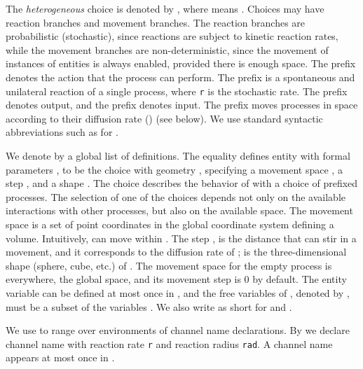 \documentclass[submission,
copyright,
creativecommons
]{eptcs}
\begin{document}
The \textit{heterogeneous} choice is denoted by ,   where  means .    Choices may
  have reaction branches and movement branches.  The reaction branches
  are probabilistic (stochastic), since reactions are subject
  to kinetic reaction rates, while the movement branches are
  non-deterministic, since the movement of instances of entities is always
  enabled, provided there is enough space. The prefix  denotes the action that the process
   can perform. The prefix  is a
  spontaneous and unilateral reaction of a single process, where
  \texttt{r} is the stochastic rate. The prefix  denotes output,
  and the prefix  denotes input.  The prefix  moves
    processes in space according to their diffusion rate () (see below).
We use standard syntactic
abbreviations such as  for
.

We denote by  a global list of definitions. The equality 
defines entity  with formal parameters , to be the choice  with geometry
, specifying a movement space , a step
, and a shape . The choice  describes the behavior of 
  with a choice of prefixed processes. The selection of one of the
  choices depends not only on the available interactions with other
  processes, but also on the available space.
The movement space  is a set of
point coordinates in the global coordinate system defining a
volume. Intuitively,  can move within .  The step , is the distance that  can stir in a movement,
and it corresponds to the diffusion rate of ;
 is the three-dimensional shape (sphere, cube, etc.) of .
The movement space for the empty process 
is everywhere, the global space, and its movement step is 0 by
default.  The entity variable  can be defined at most once  in , and the free variables of
, denoted by , must be a subset of the variables
.
We also write  as short for  and .

We use  to range over environments of channel name
declarations. By  we declare channel name 
with reaction rate \texttt{r} and reaction radius \texttt{rad}. A
channel name  appears at most once in .
\end{document}
